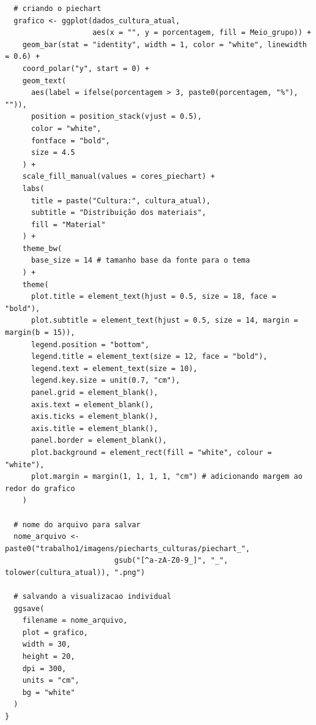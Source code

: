 \documentclass[11pt,a4paper]{article}
\begin{document}
\begin{verbatim}
  # criando o piechart
  grafico <- ggplot(dados_cultura_atual, 
                    aes(x = "", y = porcentagem, fill = Meio_grupo)) +
    geom_bar(stat = "identity", width = 1, color = "white", linewidth = 0.6) +
    coord_polar("y", start = 0) +
    geom_text(
      aes(label = ifelse(porcentagem > 3, paste0(porcentagem, "%"), "")),
      position = position_stack(vjust = 0.5),
      color = "white",
      fontface = "bold",
      size = 4.5
    ) +
    scale_fill_manual(values = cores_piechart) +
    labs(
      title = paste("Cultura:", cultura_atual),
      subtitle = "Distribuição dos materiais",
      fill = "Material"
    ) +
    theme_bw(
      base_size = 14 # tamanho base da fonte para o tema
    ) +
    theme(
      plot.title = element_text(hjust = 0.5, size = 18, face = "bold"),
      plot.subtitle = element_text(hjust = 0.5, size = 14, margin = margin(b = 15)),
      legend.position = "bottom",
      legend.title = element_text(size = 12, face = "bold"),
      legend.text = element_text(size = 10),
      legend.key.size = unit(0.7, "cm"),
      panel.grid = element_blank(),
      axis.text = element_blank(),
      axis.ticks = element_blank(),
      axis.title = element_blank(),
      panel.border = element_blank(), 
      plot.background = element_rect(fill = "white", colour = "white"),
      plot.margin = margin(1, 1, 1, 1, "cm") # adicionando margem ao redor do grafico
    )
  
  # nome do arquivo para salvar
  nome_arquivo <- paste0("trabalho1/imagens/piecharts_culturas/piechart_", 
                         gsub("[^a-zA-Z0-9_]", "_", tolower(cultura_atual)), ".png")
  
  # salvando a visualizacao individual
  ggsave(
    filename = nome_arquivo,
    plot = grafico,
    width = 30,
    height = 20,
    dpi = 300,
    units = "cm",
    bg = "white"
  )
} 
\end{verbatim}
\end{document}
